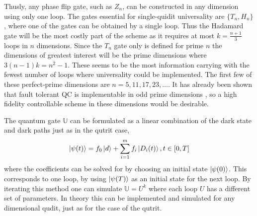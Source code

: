 Thusly, any phase flip gate, such as $Z_n$, can be constructed in any dimension using only one loop. The gates essential for single-quidit universality are $\{T_n, H_n\}$, where one of the gates can be obtained by a single loop. Thus the Hadamard gate will be the most costly part of the scheme as it requires at most $k = \frac{n+1}{3}$ loops in $n$ dimensions. Since the $T_n$ gate only is defined for prime $n$ the dimensions of greatest interest will be the prime dimensions where $3(n-1)k = n^2 -1$. These seems to be the most information carrying with the fewest number of loops where universality could be implemented. The first few of these perfect-prime dimensions are $n = 5,11,17,23,\dots$. It has already been shown that fault tolerant QC is implementable in odd prime dimensions \cite{magic-muller}, so a high fidelity controllable scheme in these dimensions would be desirable.



The quantum gate $\mathbb{U}$ can be formulated as a linear combination of the dark state and dark paths just as in the qutrit case,
\begin{equation}
\ket{\psi(t)} = f_0\ket{d} + \sum_{i = 1}^{m}f_i\ket{D_i(t)}, t \in [0,T]
\end{equation}
where the coefficients can be solved for by choosing an initial state $\ket{\psi(0)}$. This corresponds to one loop, by using $\ket{\psi(T)}$ as an initial state for the next loop. By iterating this method one can simulate $\mathbb{U} = U^k$ where each loop $U$ has a different set of parameters. In theory this can be implemented and simulated for any dimensional qudit, just as for the case of the qutrit. 






